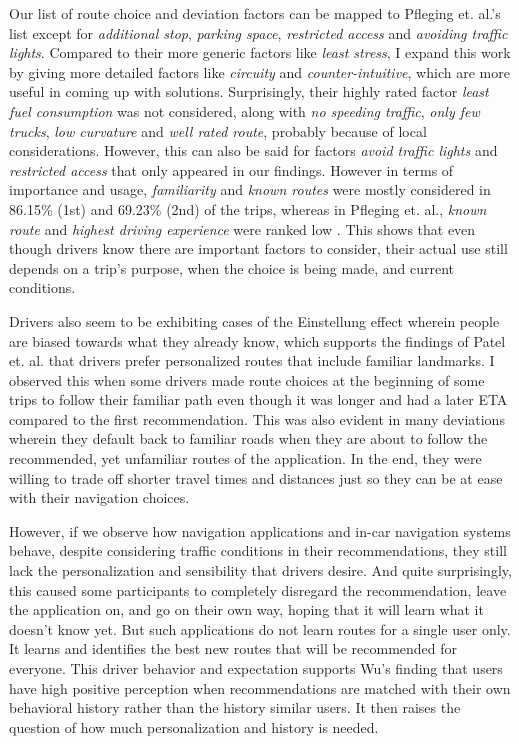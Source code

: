 Our list of route choice and deviation factors can be mapped to Pfleging et. al.'s list except for \emph{additional stop}, \emph{parking space}, \emph{restricted access} and \emph{avoiding traffic lights}. Compared to their more generic factors like \emph{least stress}, I expand this work by giving more detailed factors like \emph{circuity} and \emph{counter-intuitive}, which are more useful in coming up with solutions. Surprisingly, their highly rated factor \emph{least fuel consumption} was not considered, along with \emph{no speeding traffic}, \emph{only few trucks}, \emph{low curvature} and \emph{well rated route}, probably because of local considerations. However, this can also be said for factors \emph{avoid traffic lights} and \emph{restricted access} that  only appeared in our findings. However in terms of importance and usage, \emph{familiarity} and \emph{known routes} were mostly considered in 86.15\% (1st) and 69.23\% (2nd) of the trips, whereas in Pfleging et. al., \emph{known route} and \emph{highest driving experience} were ranked low \cite{Pfleging2014ExperienceNavigation}. This shows that even though drivers know there are important factors to consider, their actual use still depends on a trip's purpose, when the choice is being made, and current conditions. 

Drivers also seem to be exhibiting cases of the Einstellung effect \cite{Peterson2018} wherein people are biased towards what they already know, which supports the findings of Patel et. al. \cite{Patel2006PersonalizingRoutes} that drivers prefer personalized routes that include familiar landmarks. I observed this when some drivers made route choices at the beginning of some trips to follow their familiar path even though it was longer and had a later ETA compared to the first recommendation. This was also evident in many deviations wherein they default back to familiar roads when they are about to follow the recommended, yet unfamiliar routes of the application. In the end, they were willing to trade off shorter travel times and distances just so they can be at ease with their navigation choices.

However, if we observe how navigation applications and in-car navigation systems behave, despite considering traffic conditions in their recommendations, they still lack the personalization and sensibility that drivers desire. And quite surprisingly, this caused some participants to completely disregard the recommendation, leave the application on, and go on their own way, hoping that it will learn what it doesn't know yet. But such applications do not learn routes for a single user only. It learns and identifies the best new routes that will be recommended for everyone. This driver behavior and expectation supports Wu's \cite{Wu2015HybridSystems} finding that users have high positive perception when recommendations are matched with their own behavioral history rather than the history similar users. It then raises the question of how much personalization and history is needed.

